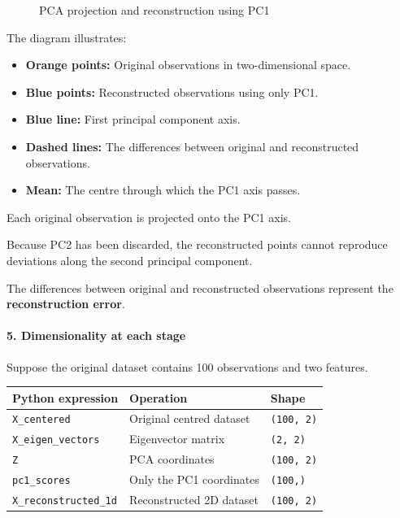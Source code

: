 \documentclass[11pt]{article}
\makeatletter
\providecommand{\tightlist}{%
      \setlength{\itemsep}{0pt}\setlength{\parskip}{0pt}}
\newcommand*\pandocbounded[1]{%
      \sbox\pandoc@box{#1}%
      \Gscale@div\@tempa\textheight{\dimexpr\ht\pandoc@box+\dp\pandoc@box\relax}%
      \Gscale@div\@tempb\linewidth{\wd\pandoc@box}%
      \ifdim\@tempb\p@<\@tempa\p@
        \let\@tempa\@tempb
      \fi
      \ifdim\@tempa\p@<\p@
        \scalebox{\@tempa}{\usebox\pandoc@box}%
      \else
        \usebox{\pandoc@box}%
      \fi
    }
\makeatother
\begin{document}
\begin{figure}
\centering
\pandocbounded{}
\caption{PCA projection and reconstruction using PC1}
\end{figure}

The diagram illustrates:

\begin{itemize}
\tightlist
\item
  \textbf{Orange points:} Original observations in two-dimensional
  space.
\item
  \textbf{Blue points:} Reconstructed observations using only PC1.
\item
  \textbf{Blue line:} First principal component axis.
\item
  \textbf{Dashed lines:} The differences between original and
  reconstructed observations.
\item
  \textbf{Mean:} The centre through which the PC1 axis passes.
\end{itemize}

Each original observation is projected onto the PC1 axis.

Because PC2 has been discarded, the reconstructed points cannot
reproduce deviations along the second principal component.

The differences between original and reconstructed observations
represent the \textbf{reconstruction error}.

\paragraph{5. Dimensionality at each
stage}\label{dimensionality-at-each-stage}

Suppose the original dataset contains 100 observations and two features.

{\def\LTcaptype{none} %
\begin{longtable}[]{@{}lll@{}}
\toprule\noalign{}
Python expression & Operation & Shape \\
\midrule\noalign{}
\endhead
\bottomrule\noalign{}
\endlastfoot
\texttt{X\_centered} & Original centred dataset & \texttt{(100,\ 2)} \\
\texttt{X\_eigen\_vectors} & Eigenvector matrix & \texttt{(2,\ 2)} \\
\texttt{Z} & PCA coordinates & \texttt{(100,\ 2)} \\
\texttt{pc1\_scores} & Only the PC1 coordinates & \texttt{(100,)} \\
\texttt{X\_reconstructed\_1d} & Reconstructed 2D dataset &
\texttt{(100,\ 2)} \\
\end{longtable}
}
\end{document}
